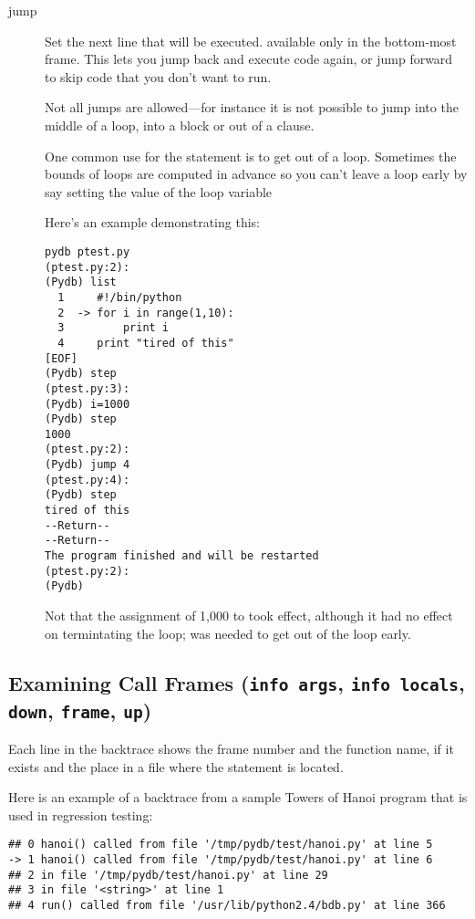 \begin{description}
\item[jump ]

Set the next line that will be executed. available only in the
bottom-most frame.  This lets you jump back and execute code
again, or jump forward to skip code that you don't want to run.

Not all jumps are allowed---for instance it is not possible to jump
into the middle of a  loop, into a  block or
out of a  clause.

One common use for the  statement is to get out of a
loop. Sometimes the bounds of loops are computed in advance so you
can't leave a loop early by say setting the value of the loop variable

Here's an example demonstrating this:

\begin{verbatim}
pydb ptest.py
(ptest.py:2): 
(Pydb) list
  1  	#!/bin/python
  2  ->	for i in range(1,10):
  3  	    print i
  4  	print "tired of this"
[EOF]
(Pydb) step
(ptest.py:3): 
(Pydb) i=1000
(Pydb) step
1000
(ptest.py:2): 
(Pydb) jump 4
(ptest.py:4): 
(Pydb) step
tired of this
--Return--
--Return--
The program finished and will be restarted
(ptest.py:2): 
(Pydb) 
\end{verbatim}

Not that the assignment of 1,000 to  took effect, although it
had no effect on termintating the  loop;  was
needed to get out of the loop early.

\end{description}

\subsection{Examining Call Frames ({\tt info args}, {\tt info
    locals}, {\tt down}, {\tt frame}, {\tt up})\label{subsection-frames}}

Each line in the backtrace shows the frame number and the function
name, if it exists and the place in a file where the statement is
located.

Here is an example of a backtrace from a sample Towers of Hanoi
program that is used in regression testing:

\begin{verbatim}
## 0 hanoi() called from file '/tmp/pydb/test/hanoi.py' at line 5
-> 1 hanoi() called from file '/tmp/pydb/test/hanoi.py' at line 6
## 2 in file '/tmp/pydb/test/hanoi.py' at line 29
## 3 in file '<string>' at line 1
## 4 run() called from file '/usr/lib/python2.4/bdb.py' at line 366
\end{verbatim}

